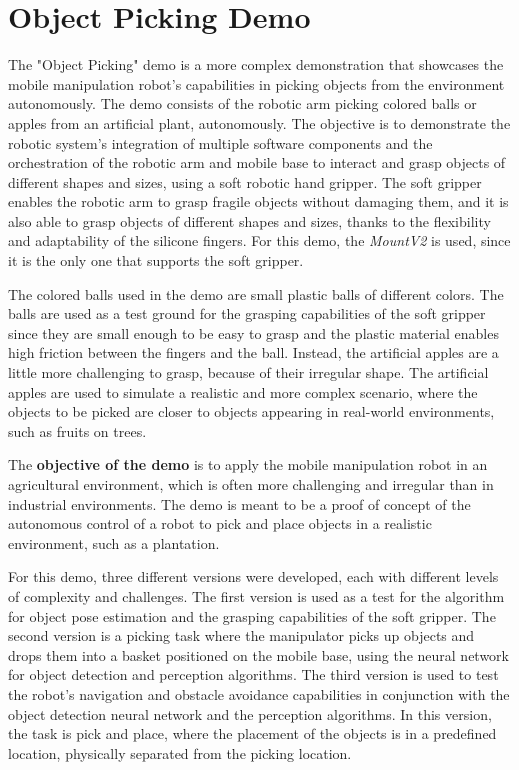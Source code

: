 \section{Object Picking Demo}

The "Object Picking" demo is a more complex demonstration that showcases the mobile manipulation robot's capabilities
in picking objects from the environment autonomously. The demo consists of the robotic arm picking colored balls
or apples from an artificial plant, autonomously. The objective is to demonstrate the robotic system's integration of
multiple software components and the orchestration of the robotic arm and mobile base to interact and grasp objects of
different shapes and sizes, using a soft robotic hand gripper.
The soft gripper enables the robotic arm to grasp fragile objects without damaging them, and it is also able to
grasp objects of different shapes and sizes, thanks to the flexibility and adaptability of the silicone fingers.
For this demo, the \textit{MountV2} is used, since it is the only one that supports the soft gripper.

The colored balls used in the demo are small plastic balls of different colors. The balls are used as a
test ground for the grasping capabilities of the soft gripper since they are small enough to be easy to grasp
and the plastic material enables high friction between the fingers and the ball. Instead, the artificial apples
are a little more challenging to grasp, because of their irregular shape.
The artificial apples are used to simulate a realistic and more complex scenario, where the objects to be picked are
closer to objects appearing in real-world environments, such as fruits on trees.

The \textbf{objective of the demo} is to apply the mobile manipulation robot in an agricultural environment, which is
often more challenging and irregular than in industrial environments. The demo is meant to be a proof of concept
of the autonomous control of a robot to pick and place objects in a realistic environment, such as a plantation.

For this demo, three different versions were developed, each with different levels of complexity and challenges.
The first version is used as a test for the algorithm for object pose estimation and the grasping capabilities
of the soft gripper. The second version is a picking task where the manipulator picks up objects and drops them
into a basket positioned on the mobile base, using the neural network for object detection and perception algorithms.
The third version is used to test the robot's navigation and obstacle avoidance capabilities
in conjunction with the object detection neural network and the perception algorithms. In this version,
the task is pick and place, where the placement of the objects is in a predefined location, physically separated
from the picking location.


